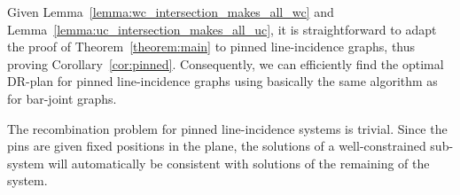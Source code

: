 Given Lemma~\ref{lemma:wc_intersection_makes_all_wc} and Lemma~\ref{lemma:uc_intersection_makes_all_uc},
it is straightforward to adapt the proof of Theorem~\ref{theorem:main}
to  pinned line-incidence graphs,
thus proving Corollary~\ref{cor:pinned}.
Consequently, we can efficiently find the optimal DR-plan for  pinned line-incidence graphs using basically the same algorithm as for  bar-joint graphs.

 The recombination problem for  pinned line-incidence systems is trivial.
Since the pins are given fixed positions in the plane,
 the solutions of a well-constrained sub-system will automatically be consistent with solutions of the remaining of the system.


